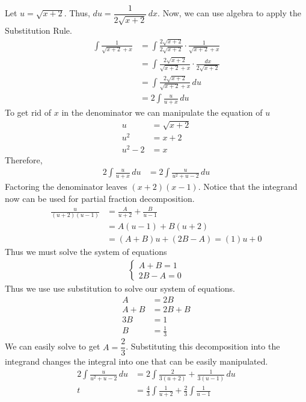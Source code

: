 \documentclass{article}
\begin{document}
\begin{enumerate}[label=\textbf{(4.\arabic*)}]
Let $u=\sqrt{x+2}$. Thus, $du=\dfrac{1}{2\sqrt{x+2}}\,dx$. Now, we can use algebra to apply the Substitution Rule.
\begin{align*}
    \int\!\frac{1}{\sqrt{x+2}+x}&=\int\!\frac{2\sqrt{x+2}}{2\sqrt{x+2}}\cdot\frac{1}{\sqrt{x+2}+x} \\
    &=\int\!\frac{2\sqrt{x+2}}{\sqrt{x+2}+x}\cdot\frac{dx}{2\sqrt{x+2}} \\
    &=\int\!\frac{2\sqrt{x+2}}{\sqrt{x+2}+x}\, du \\
    &=2\int\!\frac{u}{u+x}\, du
\end{align*}
To get rid of $x$ in the denominator we can manipulate the equation of $u$
\begin{align*}
    u&=\sqrt{x+2} \\
    u^2 &= x+2 \\
    u^2-2 &= x
\end{align*}
Therefore,
\begin{align*}
    2\int\!\frac{u}{u+x}\, du &= 2\int\!\frac{u}{u^2+u-2}\, du
\end{align*}
Factoring the denominator leaves $(x+2)(x-1)$. Notice that the integrand now can be used for partial fraction decomposition.
\begin{align*}
    \frac{u}{(u+2)(u-1)}&=\frac{A}{u+2}+\frac{B}{u-1} \\
    &=A(u-1)+B(u+2) \\
    &=(A+B)u+(2B-A) = (1)u+0
\end{align*}
Thus we must solve the system of equations
\begin{align*}
    \begin{cases}
        A+B=1 \\
        2B-A=0
    \end{cases}
\end{align*}
Thus we use use substitution to solve our system of equations.
\begin{align*}
    A&=2B \\
    A+B&=2B+B \\
    3B&=1 \\
    B&=\frac{1}{3}
\end{align*}
We can easily solve to get $A=\dfrac{2}{3}$. Substituting this decomposition into the integrand changes the integral into one that can be easily manipulated.
\begin{align*}
    2\int\!\frac{u}{u^2+u-2}\, du&=2\int\!\frac{2}{3(u+2)}+\frac{1}{3(u-1)}\,du \\t
    &=\frac{4}{3}\int\!\frac{1}{u+2}+\frac{2}{3}\int\!\frac{1}{u-1} \\

\end{align*}
\end{enumerate}
\end{document}

